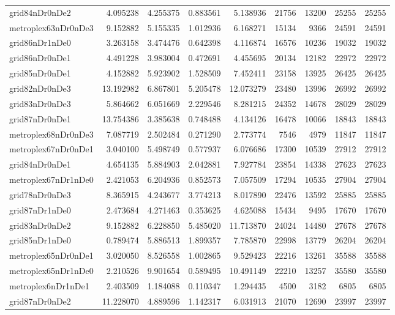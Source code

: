 \begin{longtable}{|l|r|r|r|r|r|r|r|r|}
grid84nDr0nDe2 & 4.095238 & 4.255375 & 0.883561 & 5.138936 & 21756 & 13200 & 25255 & 25255 \\
metroplex63nDr0nDe3 & 9.152882 & 5.155335 & 1.012936 & 6.168271 & 15134 & 9366 & 24591 & 24591 \\
grid86nDr1nDe0 & 3.263158 & 3.474476 & 0.642398 & 4.116874 & 16576 & 10236 & 19032 & 19032 \\
grid86nDr0nDe1 & 4.491228 & 3.983004 & 0.472691 & 4.455695 & 20134 & 12182 & 22972 & 22972 \\
grid85nDr0nDe1 & 4.152882 & 5.923902 & 1.528509 & 7.452411 & 23158 & 13925 & 26425 & 26425 \\
grid82nDr0nDe3 & 13.192982 & 6.867801 & 5.205478 & 12.073279 & 23480 & 13996 & 26992 & 26992 \\
grid83nDr0nDe3 & 5.864662 & 6.051669 & 2.229546 & 8.281215 & 24352 & 14678 & 28029 & 28029 \\
grid87nDr0nDe1 & 13.754386 & 3.385638 & 0.748488 & 4.134126 & 16478 & 10066 & 18843 & 18843 \\
metroplex68nDr0nDe3 & 7.087719 & 2.502484 & 0.271290 & 2.773774 & 7546 & 4979 & 11847 & 11847 \\
metroplex67nDr0nDe1 & 3.040100 & 5.498749 & 0.577937 & 6.076686 & 17300 & 10539 & 27912 & 27912 \\
grid84nDr0nDe1 & 4.654135 & 5.884903 & 2.042881 & 7.927784 & 23854 & 14338 & 27623 & 27623 \\
metroplex67nDr1nDe0 & 2.421053 & 6.204936 & 0.852573 & 7.057509 & 17294 & 10535 & 27904 & 27904 \\
grid78nDr0nDe3 & 8.365915 & 4.243677 & 3.774213 & 8.017890 & 22476 & 13592 & 25885 & 25885 \\
grid87nDr1nDe0 & 2.473684 & 4.271463 & 0.353625 & 4.625088 & 15434 & 9495 & 17670 & 17670 \\
grid83nDr0nDe2 & 9.152882 & 6.228850 & 5.485020 & 11.713870 & 24024 & 14480 & 27678 & 27678 \\
grid85nDr1nDe0 & 0.789474 & 5.886513 & 1.899357 & 7.785870 & 22998 & 13779 & 26204 & 26204 \\
metroplex65nDr0nDe1 & 3.020050 & 8.526558 & 1.002865 & 9.529423 & 22216 & 13261 & 35588 & 35588 \\
metroplex65nDr1nDe0 & 2.210526 & 9.901654 & 0.589495 & 10.491149 & 22210 & 13257 & 35580 & 35580 \\
metroplex6nDr1nDe1 & 2.403509 & 1.184088 & 0.110347 & 1.294435 & 4500 & 3182 & 6805 & 6805 \\
grid87nDr0nDe2 & 11.228070 & 4.889596 & 1.142317 & 6.031913 & 21070 & 12690 & 23997 & 23997 \\

\end{longtable}
